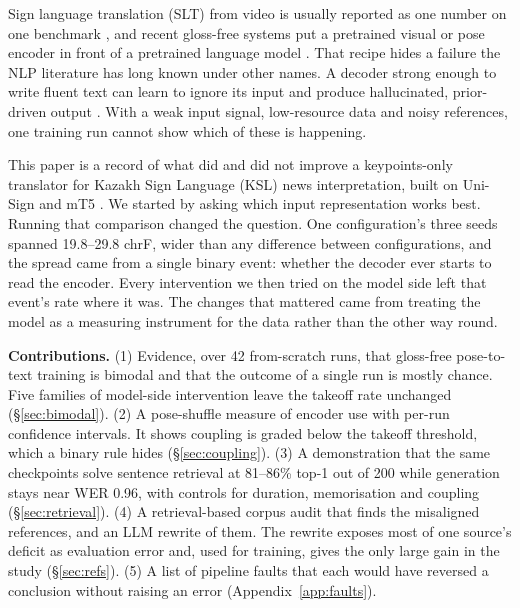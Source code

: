 \documentclass[11pt,twocolumn,a4paper]{article}
\renewcommand{\paragraph}[1]{\par\smallskip\noindent\textbf{#1}\hspace{0.5em}}
\begin{document}
Sign language translation (SLT) from video is usually reported as one number on one benchmark \citep{camgoz2018nslt,camgoz2020slt}, and recent gloss-free systems put a pretrained visual or pose encoder in front of a pretrained language model \citep{zhou2023gfslt,wong2024sign2gpt,gong2024signllm,li2025unisign}. That recipe hides a failure the NLP literature has long known under other names. A decoder strong enough to write fluent text can learn to ignore its input \citep{bowman2016generating,voita2021analyzing} and produce hallucinated, prior-driven output \citep{lee2018hallucinations}. With a weak input signal, low-resource data and noisy references, one training run cannot show which of these is happening.

This paper is a record of what did and did not improve a keypoints-only translator for Kazakh Sign Language (KSL) news interpretation, built on Uni-Sign \citep{li2025unisign} and mT5 \citep{xue2021mt5}. We started by asking which input representation works best. Running that comparison changed the question. One configuration's three seeds spanned 19.8--29.8 chrF, wider than any difference between configurations, and the spread came from a single binary event: whether the decoder ever starts to read the encoder. Every intervention we then tried on the model side left that event's rate where it was. The changes that mattered came from treating the model as a measuring instrument for the data rather than the other way round.

\paragraph{Contributions.}
(1) Evidence, over 42 from-scratch runs, that gloss-free pose-to-text training is bimodal and that the outcome of a single run is mostly chance. Five families of model-side intervention leave the takeoff rate unchanged (\S\ref{sec:bimodal}). (2) A pose-shuffle measure of encoder use with per-run confidence intervals. It shows coupling is graded below the takeoff threshold, which a binary rule hides (\S\ref{sec:coupling}). (3) A demonstration that the same checkpoints solve sentence retrieval at 81--86\% top-1 out of 200 while generation stays near WER 0.96, with controls for duration, memorisation and coupling (\S\ref{sec:retrieval}). (4) A retrieval-based corpus audit that finds the misaligned references, and an LLM rewrite of them. The rewrite exposes most of one source's deficit as evaluation error and, used for training, gives the only large gain in the study (\S\ref{sec:refs}). (5) A list of pipeline faults that each would have reversed a conclusion without raising an error (Appendix~\ref{app:faults}).
\end{document}
